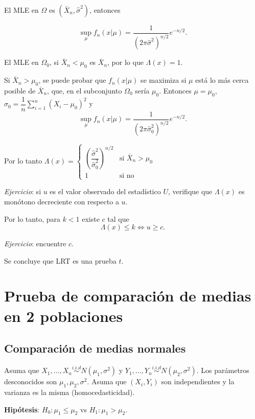 \documentclass[
  12pt,
]{book}
\begin{document}
El MLE en \(\Omega\) es \((\bar X_n,\hat\sigma^2)\), entonces

\[\sup_{\mu}f_n(x|\mu) = \dfrac1{(2\pi\hat\sigma^2)^{n/2}}e^{-n/2}.\]

El MLE en \(\Omega_0\), si \(\bar X_n<\mu_0\) es \(\bar X_n\), por lo que \(\Lambda(x) =1\).

Si \(\bar X_n>\mu_0\), se puede probar que \(f_n(x|\mu)\) se maximiza si \(\mu\) está lo más cerca posible de \(\bar X_n\), que, en el subconjunto \(\Omega_0\) sería \(\mu_0\). Entonces \(\mu = \mu_0\), \(\hat\sigma_0 = \dfrac 1n \sum_{i=1}^n(X_i-\mu_0)^2\) y
\[\sup_{\mu}f_n(x|\mu) = \dfrac1{(2\pi\hat\sigma_0^2)^{n/2}}e^{-n/2}.\]

Por lo tanto
\(\Lambda(x) = \begin{cases}\left(\dfrac{\hat \sigma^2}{\hat\sigma_0^2}\right)^{n/2}& \text{si }\bar X_n>\mu_0\\ 1 & \text{si no}\end{cases}\)

\emph{Ejercicio}: si \(u\) es el valor observado del estadístico \(U\), verifique que \(\Lambda(x)\) es monótono decreciente con respecto a \(u\).

Por lo tanto, para \(k<1\) existe \(c\) tal que
\[\Lambda(x) \leq k \Leftrightarrow u\geq c.\]

\emph{Ejercicio}: encuentre \(c\).

Se concluye que LRT es una prueba \(t\).

\hypertarget{prueba-de-comparaciuxf3n-de-medias-en-2-poblaciones}{%
\chapter{Prueba de comparación de medias en 2 poblaciones}\label{prueba-de-comparaciuxf3n-de-medias-en-2-poblaciones}}

\hypertarget{comparaciuxf3n-de-medias-normales}{%
\section{Comparación de medias normales}\label{comparaciuxf3n-de-medias-normales}}

Asuma que \(X_1,\dots, X_n\overset{i.i.d}{\sim} N(\mu_1,\sigma^2)\) y \(Y_1,\dots, Y_n\overset{i.i.d}{\sim} N(\mu_2,\sigma^2)\). Los parámetros desconocidos son \(\mu_1,\mu_2,\sigma^2\). Asuma que \((X_i,Y_i)\) son independientes y la varianza es la misma (homocedasticidad).

\textbf{Hipótesis}: \(H_0: \mu_1\leq\mu_2\) vs \(H_1: \mu_1>\mu_2\).
\end{document}
